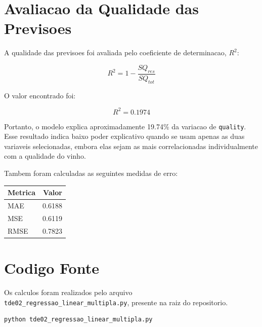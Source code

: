 \documentclass[12pt,a4paper]{article}
\begin{document}
\section{Avaliacao da Qualidade das Previsoes}

A qualidade das previsoes foi avaliada pelo coeficiente de determinacao, $R^2$:

\[
R^2 = 1 - \frac{SQ_{res}}{SQ_{tot}}
\]

O valor encontrado foi:

\[
R^2 = 0.1974
\]

Portanto, o modelo explica aproximadamente 19.74\% da variacao de \texttt{quality}. Esse resultado indica baixo poder explicativo quando se usam apenas as duas variaveis selecionadas, embora elas sejam as mais correlacionadas individualmente com a qualidade do vinho.

Tambem foram calculadas as seguintes medidas de erro:

\begin{table}[h]
\centering
\begin{tabular}{lr}
\toprule
\textbf{Metrica} & \textbf{Valor} \\
\midrule
MAE & 0.6188 \\
MSE & 0.6119 \\
RMSE & 0.7823 \\
\bottomrule
\end{tabular}
\end{table}

\section{Codigo Fonte}

Os calculos foram realizados pelo arquivo \texttt{tde02\_regressao\_linear\_multipla.py}, presente na raiz do repositorio.

\begin{lstlisting}
python tde02_regressao_linear_multipla.py
\end{lstlisting}
\end{document}
